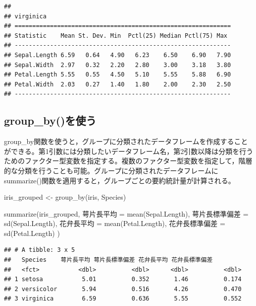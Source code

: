\documentclass[
]{book}
\newenvironment{Shaded}{\begin{snugshade}}{\end{snugshade}}
\newcommand{\FunctionTok}[1]{\textcolor[rgb]{0.00,0.00,0.00}{#1}}
\newcommand{\NormalTok}[1]{#1}
\newcommand{\OtherTok}[1]{\textcolor[rgb]{0.56,0.35,0.01}{#1}}
\begin{document}
\begin{verbatim}
## 
## virginica
## =============================================================
## Statistic    Mean St. Dev. Min  Pctl(25) Median Pctl(75) Max 
## -------------------------------------------------------------
## Sepal.Length 6.59   0.64   4.90   6.23    6.50    6.90   7.90
## Sepal.Width  2.97   0.32   2.20   2.80    3.00    3.18   3.80
## Petal.Length 5.55   0.55   4.50   5.10    5.55    5.88   6.90
## Petal.Width  2.03   0.27   1.40   1.80    2.00    2.30   2.50
## -------------------------------------------------------------
\end{verbatim}

\hypertarget{group_byux3092ux4f7fux3046}{%
\subsection{group\_by()を使う}\label{group_byux3092ux4f7fux3046}}

group\_by関数を使うと，グループに分類されたデータフレームを作成することができる。第1引数には分類したいデータフレーム名，第2引数以降は分類を行うためのファクター型変数を指定する。複数のファクター型変数を指定して，階層的な分類を行うことも可能。グループに分類されたデータフレームにsummarize()関数を適用すると，グループごとの要約統計量が計算される。

\begin{Shaded}
\begin{Highlighting}[]
\NormalTok{iris\_grouped }\OtherTok{\textless{}{-}} \FunctionTok{group\_by}\NormalTok{(iris, Species)}

\FunctionTok{summarize}\NormalTok{(iris\_grouped, }
\NormalTok{          萼片長平均     }\OtherTok{=} \FunctionTok{mean}\NormalTok{(Sepal.Length),}
\NormalTok{          萼片長標準偏差 }\OtherTok{=} \FunctionTok{sd}\NormalTok{(Sepal.Length),}
\NormalTok{          花弁長平均     }\OtherTok{=} \FunctionTok{mean}\NormalTok{(Petal.Length),}
\NormalTok{          花弁長標準偏差 }\OtherTok{=} \FunctionTok{sd}\NormalTok{(Petal.Length)}
\NormalTok{          )}
\end{Highlighting}
\end{Shaded}

\begin{verbatim}
## # A tibble: 3 x 5
##   Species    萼片長平均 萼片長標準偏差 花弁長平均 花弁長標準偏差
##   <fct>           <dbl>          <dbl>      <dbl>          <dbl>
## 1 setosa           5.01          0.352       1.46          0.174
## 2 versicolor       5.94          0.516       4.26          0.470
## 3 virginica        6.59          0.636       5.55          0.552
\end{verbatim}
\end{document}
